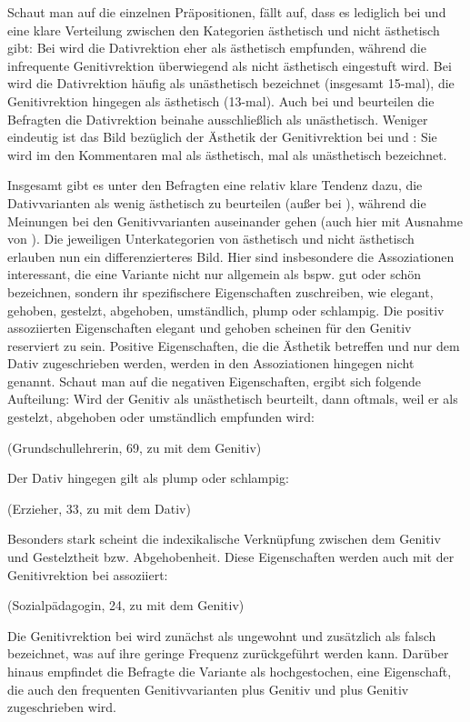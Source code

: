 Schaut man auf die einzelnen Präpositionen, fällt auf, dass es lediglich bei \gegenueber{} und \waehrend{} eine klare Verteilung zwischen den Kategorien \glqq ästhetisch\grqq{} und \glqq nicht ästhetisch\grqq{} gibt: 
Bei \gegenueber{} wird die Dativrektion eher als ästhetisch empfunden, während die infrequente Genitivrektion überwiegend als nicht ästhetisch eingestuft wird. 
Bei \waehrend{} wird die Dativrektion häufig als unästhetisch bezeichnet (insgesamt 15-mal), die Genitivrektion hingegen als ästhetisch (13-mal). 
Auch bei \dank{} und \wegen{} beurteilen die Befragten die Dativrektion beinahe ausschließlich als unästhetisch. 
Weniger eindeutig ist das Bild bezüglich der Ästhetik der Genitivrektion bei \dank{} und \wegen{}:
Sie wird im den Kommentaren mal als ästhetisch, mal als unästhetisch bezeichnet. 

Insgesamt gibt es unter den Befragten eine relativ klare Tendenz dazu, die Dativvarianten als wenig ästhetisch zu beurteilen (außer bei \gegenueber), während die Meinungen bei den Genitivvarianten auseinander gehen (auch hier mit Ausnahme von \gegenueber). 
Die jeweiligen Unterkategorien von \glqq ästhetisch\grqq{} und \glqq nicht ästhetisch\grqq{} erlauben nun ein differenzierteres Bild. 
Hier sind insbesondere die Assoziationen interessant, die eine Variante nicht nur allgemein als bspw. gut oder schön bezeichnen, sondern ihr spezifischere Eigenschaften zuschreiben, wie elegant, gehoben, gestelzt, abgehoben, umständlich, plump oder schlampig.
Die positiv assoziierten Eigenschaften elegant und gehoben scheinen für den Genitiv reserviert zu sein. 
Positive Eigenschaften, die die Ästhetik betreffen und nur dem Dativ zugeschrieben werden, werden in den Assoziationen hingegen nicht genannt. 
Schaut man auf die negativen Eigenschaften, ergibt sich folgende Aufteilung: 
Wird der Genitiv als unästhetisch beurteilt, dann oftmals, weil er als gestelzt, abgehoben oder umständlich empfunden wird: 
\begin{exe}
\ex {} (Grundschullehrerin, 69, zu \dank{} mit dem Genitiv)
\end{exe}
Der Dativ hingegen gilt als plump oder schlampig: 
\begin{exe}
\ex {} (Erzieher, 33, zu \waehrend{} mit dem Dativ)
\end{exe}

Besonders stark scheint die indexikalische Verknüpfung zwischen dem Genitiv und Gestelztheit bzw. Abgehobenheit. 
Diese Eigenschaften werden auch mit der Genitivrektion bei \gegenueber{} assoziiert: 
\begin{exe}
\ex {} (Sozialpädagogin, 24, zu \gegenueber{} mit dem Genitiv)
\end{exe}
Die Genitivrektion bei \gegenueber{} wird zunächst als ungewohnt und zusätzlich als falsch bezeichnet, was auf ihre geringe Frequenz zurückgeführt werden kann. 
Darüber hinaus empfindet die Befragte die Variante als \glqq hochgestochen\grqq, eine Eigenschaft, die auch den frequenten Genitivvarianten \wegen{} plus Genitiv und \waehrend{} plus Genitiv zugeschrieben wird. 

